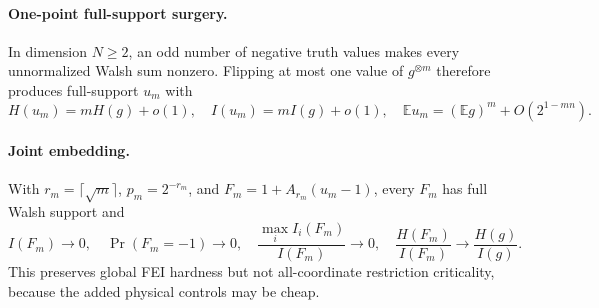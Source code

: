 \paragraph{One-point full-support surgery.}
In dimension $N\ge2$, an odd number of negative truth values makes every
unnormalized Walsh sum nonzero. Flipping at most one value of $g^{\otimes m}$
therefore produces full-support $u_m$ with
\[
 H(u_m)=mH(g)+o(1),\quad I(u_m)=mI(g)+o(1),
\quad \mathbb Eu_m=(\mathbb Eg)^m+O(2^{1-mn}).
\]

\paragraph{Joint embedding.}
With $r_m=\lceil\sqrt m\rceil$, $p_m=2^{-r_m}$, and
$F_m=1+A_{r_m}(u_m-1)$, every $F_m$ has full Walsh support and
\[
 I(F_m)\to0,\quad \Pr(F_m=-1)\to0,\quad
 \frac{\max_iI_i(F_m)}{I(F_m)}\to0,
\quad \frac{H(F_m)}{I(F_m)}\to\frac{H(g)}{I(g)}.
\]
This preserves global FEI hardness but not all-coordinate restriction
criticality, because the added physical controls may be cheap.
